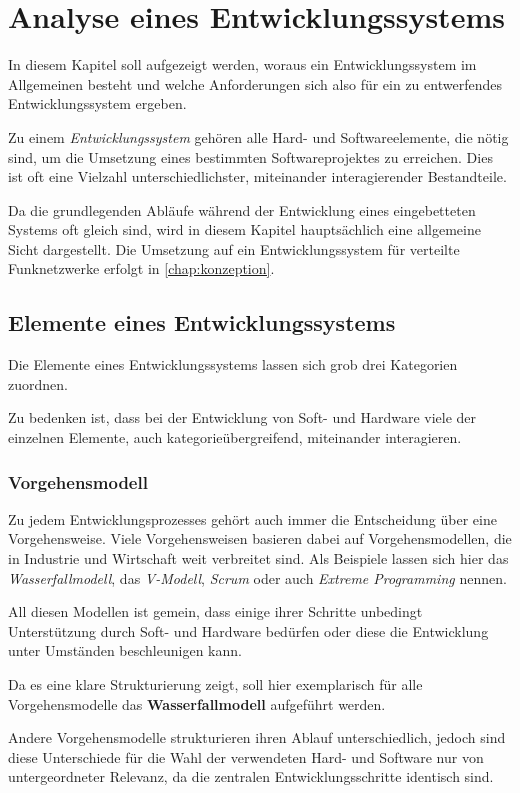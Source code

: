 \chapter{Analyse eines Entwicklungssystems}\label{chap:analyse}
\minitoc
In diesem Kapitel soll aufgezeigt werden, woraus ein Entwicklungssystem
im Allgemeinen besteht und welche Anforderungen sich also für ein zu
entwerfendes Entwicklungssystem ergeben.
\begin{definition}[Entwicklungssystem]
Zu einem \emph{Entwicklungssystem} gehören
alle Hard- und Softwareelemente, die nötig sind, um die Umsetzung eines
bestimmten Softwareprojektes zu erreichen. Dies ist oft eine Vielzahl
unterschiedlichster, miteinander interagierender Bestandteile.
\end{definition}
Da die grundlegenden Abläufe während der Entwicklung eines eingebetteten
Systems oft gleich sind, wird in diesem Kapitel hauptsächlich eine allgemeine
Sicht dargestellt. Die Umsetzung auf ein Entwicklungssystem für verteilte
Funknetzwerke erfolgt in \autoref{chap:konzeption}.
\clearpage
\section{Elemente eines Entwicklungssystems}
Die Elemente eines Entwicklungssystems lassen sich grob drei Kategorien
zuordnen. 

Zu bedenken ist, dass bei der Entwicklung von Soft- und Hardware viele der
einzelnen Elemente, auch kategorieübergreifend, miteinander interagieren. 
\subsection{Vorgehensmodell}
Zu jedem Entwicklungsprozesses gehört auch immer die Entscheidung über eine
Vorgehensweise. Viele Vorgehensweisen basieren dabei auf Vorgehensmodellen,
die in Industrie und Wirtschaft weit verbreitet sind. Als Beispiele lassen sich
hier das \emph{Wasserfallmodell}, das \emph{V-Modell}, \emph{Scrum} oder auch
\emph{Extreme Programming} nennen.

All diesen Modellen ist gemein, dass einige ihrer Schritte
unbedingt Unterstützung durch Soft- und Hardware bedürfen oder
diese die Entwicklung unter Umständen beschleunigen kann.

Da es eine klare Strukturierung zeigt, soll hier exemplarisch für alle
Vorgehensmodelle das \textbf{Wasserfallmodell} aufgeführt werden.

Andere Vorgehensmodelle strukturieren ihren Ablauf unterschiedlich, jedoch sind
diese Unterschiede für die Wahl der verwendeten Hard- und Software nur von
untergeordneter Relevanz, da die zentralen Entwicklungsschritte
identisch sind.


